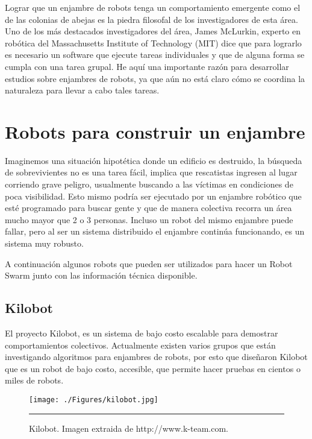 Lograr que un enjambre de robots tenga un comportamiento emergente como el de las colonias de abejas es la piedra filosofal de los investigadores de esta área. Uno de los más destacados investigadores del área, James McLurkin, experto en robótica del Massachusetts Institute of Technology (MIT) dice que para lograrlo es necesario un software que ejecute tareas individuales y     que de alguna forma se cumpla con una tarea grupal. He aquí una importante razón para desarrollar estudios sobre enjambres de robots, ya que aún no está claro cómo se coordina la naturaleza para llevar a cabo tales tareas.

\section{Robots para construir un enjambre}

Imaginemos una situación hipotética donde un edificio es destruido, la búsqueda de sobrevivientes no es una tarea fácil, implica que rescatistas ingresen al lugar corriendo grave peligro, usualmente buscando a las víctimas en condiciones de poca visibilidad. Esto mismo podría ser ejecutado por un enjambre robótico que esté programado para buscar gente y que de manera colectiva recorra un área mucho mayor que 2 o 3 personas. Incluso un robot del mismo enjambre puede fallar, pero al ser un sistema distribuido el enjambre continúa funcionando, es un sistema muy robusto.

A continuación algunos robots que pueden ser utilizados para hacer un Robot Swarm junto con las información técnica disponible.


\subsection{Kilobot}
El proyecto Kilobot, es un sistema de bajo costo escalable para demostrar comportamientos colectivos. Actualmente existen varios grupos que están investigando algoritmos para enjambres de robots, por esto que diseñaron Kilobot que es un robot de bajo costo, accesible,  que permite hacer pruebas en cientos o miles de robots.

\begin{figure}[htbp]
	\centering
		\texttt{[image: ./Figures/kilobot.jpg]}
		\rule{35em}{0.5pt}
	\caption[swarm]{Kilobot. Imagen extraida de http://www.k-team.com.}
	\label{fig:kilobot}
\end{figure}




